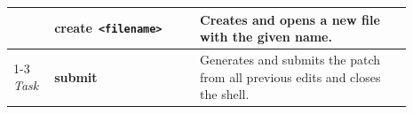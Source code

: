 \begin{table}[t]
\begin{tabular}{p{0.08\linewidth}>{\raggedright\arraybackslash}p{0.33\linewidth}p{0.48\linewidth}}
\addlinespace
& \textbf{create}\texttt{ <filename>} & Creates and opens a new file with the given name. \\
\cmidrule(lr){1-3}
\textit{Task} & \textbf{submit} & Generates and submits the patch from all previous edits and closes the shell. \\
\bottomrule
\end{tabular}
\vspace{-2em}
\end{table}